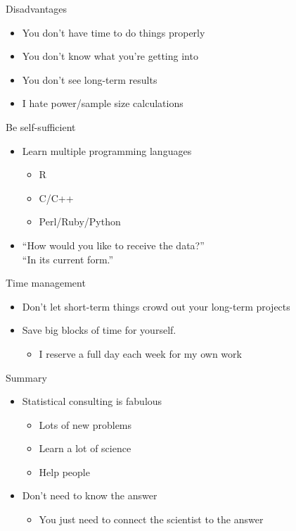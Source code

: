 \documentclass[12pt,t]{beamer}
\newcommand{\bbi}{\vspace{24pt} \begin{itemize} \itemsep12pt}
\newcommand{\bi}{\begin{itemize}}
\newcommand{\ei}{\end{itemize}}
\begin{document}
\begin{frame}{Disadvantages}

\bbi
\item You don't have time to do things properly
\item You don't know what you're getting into
\item You don't see long-term results
\item I hate power/sample size calculations
\ei
\end{frame}

\begin{frame}{Be self-sufficient}

\bbi
\item Learn multiple programming languages
\bi
\item R
\item C/C++
\item Perl/Ruby/Python
\ei
\item ``How would you like to receive the data?'' \\[12pt]
{\color{vhilight} ``In its current form.''}
\ei
\end{frame}

\begin{frame}{Time management}

\bbi
\item Don't let short-term things crowd out your long-term projects
\item Save big blocks of time for yourself.
\bi
\item I reserve a full day each week for my own work
\ei
\ei
\end{frame}

\begin{frame}{Summary}

\bbi
\item Statistical consulting is fabulous
\bi
\item Lots of new problems
\item Learn a lot of science
\item Help people
\ei
\item Don't need to know the answer
\bi
\item You just need to connect the scientist to the answer
\ei
\ei
\end{frame}
\end{document}
